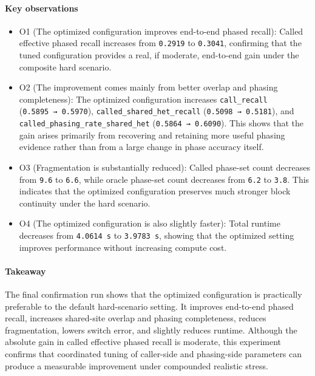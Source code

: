 \documentclass[
]{article}
\begin{document}
\paragraph{Key observations}\label{key-observations-12}

\begin{itemize}
\item
  O1 (The optimized configuration improves end-to-end phased recall):
  Called effective phased recall increases from \texttt{0.2919} to
  \texttt{0.3041}, confirming that the tuned configuration provides a
  real, if moderate, end-to-end gain under the composite hard scenario.
\item
  O2 (The improvement comes mainly from better overlap and phasing
  completeness): The optimized configuration increases
  \texttt{call\_recall} (\texttt{0.5895\ →\ 0.5970}),
  \texttt{called\_shared\_het\_recall} (\texttt{0.5098\ →\ 0.5181}), and
  \texttt{called\_phasing\_rate\_shared\_het}
  (\texttt{0.5864\ →\ 0.6090}). This shows that the gain arises
  primarily from recovering and retaining more useful phasing evidence
  rather than from a large change in phase accuracy itself.
\item
  O3 (Fragmentation is substantially reduced): Called phase-set count
  decreases from \texttt{9.6} to \texttt{6.6}, while oracle phase-set
  count decreases from \texttt{6.2} to \texttt{3.8}. This indicates that
  the optimized configuration preserves much stronger block continuity
  under the hard scenario.
\item
  O4 (The optimized configuration is also slightly faster): Total
  runtime decreases from \texttt{4.0614\ s} to \texttt{3.9783\ s},
  showing that the optimized setting improves performance without
  increasing compute cost.
\end{itemize}

\paragraph{Takeaway}\label{takeaway-12}

The final confirmation run shows that the optimized configuration is
practically preferable to the default hard-scenario setting. It improves
end-to-end phased recall, increases shared-site overlap and phasing
completeness, reduces fragmentation, lowers switch error, and slightly
reduces runtime. Although the absolute gain in called effective phased
recall is moderate, this experiment confirms that coordinated tuning of
caller-side and phasing-side parameters can produce a measurable
improvement under compounded realistic stress.
\end{document}
